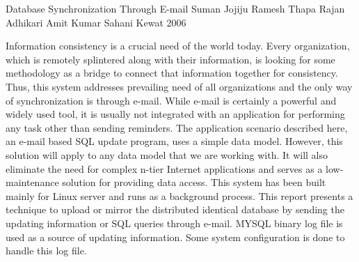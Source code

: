  \begin{conf-abstract}[]
{Database Synchronization Through E-mail}
{
Suman Jojiju
Ramesh Thapa 
Rajan Adhikari
Amit Kumar Sahani Kewat
}
{2006}

Information consistency is a crucial need of the world today. Every organization, which is remotely splintered along with their information, is looking for some methodology as a bridge to connect that information together for consistency. Thus, this system addresses prevailing need of all organizations and the only way of synchronization is through e-mail. While e-mail is certainly a powerful and widely used tool, it is usually not integrated with an application for performing any task other than sending reminders. The application scenario described here, an e-mail based SQL update program, uses a simple data model. However, this solution will apply to any data model that we are working with. It will also eliminate the need for complex n-tier Internet applications and serves as a low-maintenance solution for providing data access. This system has been built mainly for Linux server and runs as a background process. This report presents a technique to upload or mirror the distributed identical database by sending the updating information or SQL queries through e-mail. MYSQL binary log file is used as a source of updating information. Some system configuration is done to handle this log file.
  \end{conf-abstract}